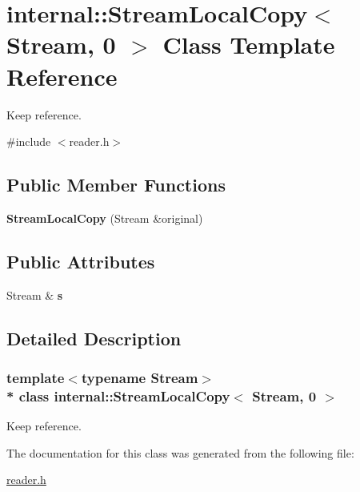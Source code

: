 \hypertarget{a00286}{}\section{internal\+:\+:Stream\+Local\+Copy$<$ Stream, 0 $>$ Class Template Reference}
\label{a00286}


Keep reference.  




{\ttfamily \#include $<$reader.\+h$>$}

\subsection*{Public Member Functions}
\begin{DoxyCompactItemize}
\item 
{\bfseries Stream\+Local\+Copy} (Stream \&original)\hypertarget{a00286_ac684a7be07d79d6ddd274dc1150f4b79}{}\label{a00286_ac684a7be07d79d6ddd274dc1150f4b79}

\end{DoxyCompactItemize}
\subsection*{Public Attributes}
\begin{DoxyCompactItemize}
\item 
Stream \& {\bfseries s}\hypertarget{a00286_ad31147888384f4bd51eabc2d7acdc4b6}{}\label{a00286_ad31147888384f4bd51eabc2d7acdc4b6}

\end{DoxyCompactItemize}


\subsection{Detailed Description}
\subsubsection*{template$<$typename Stream$>$\\*
class internal\+::\+Stream\+Local\+Copy$<$ Stream, 0 $>$}

Keep reference. 

The documentation for this class was generated from the following file\+:\begin{DoxyCompactItemize}
\item 
\hyperlink{a00683}{reader.\+h}\end{DoxyCompactItemize}
